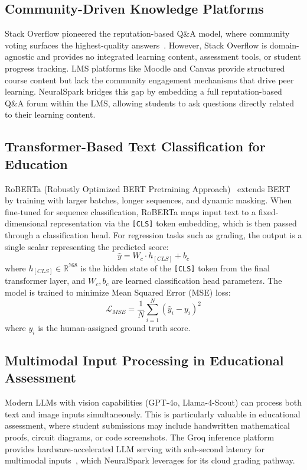 \documentclass[conference]{IEEEtran}
\begin{document}
\subsection{Community-Driven Knowledge Platforms}
Stack Overflow pioneered the reputation-based Q\&A model, where community voting surfaces the highest-quality answers~\cite{stackoverflow_study}. However, Stack Overflow is domain-agnostic and provides no integrated learning content, assessment tools, or student progress tracking. LMS platforms like Moodle and Canvas provide structured course content but lack the community engagement mechanisms that drive peer learning. NeuralSpark bridges this gap by embedding a full reputation-based Q\&A forum within the LMS, allowing students to ask questions directly related to their learning content.

\subsection{Transformer-Based Text Classification for Education}
RoBERTa (Robustly Optimized BERT Pretraining Approach)~\cite{roberta} extends BERT~\cite{bert} by training with larger batches, longer sequences, and dynamic masking. When fine-tuned for sequence classification, RoBERTa maps input text to a fixed-dimensional representation via the \texttt{[CLS]} token embedding, which is then passed through a classification head. For regression tasks such as grading, the output is a single scalar representing the predicted score:
\begin{equation}
\hat{y} = W_c \cdot h_{[CLS]} + b_c
\end{equation}
where $h_{[CLS]} \in \mathbb{R}^{768}$ is the hidden state of the \texttt{[CLS]} token from the final transformer layer, and $W_c, b_c$ are learned classification head parameters. The model is trained to minimize Mean Squared Error (MSE) loss:
\begin{equation}
\mathcal{L}_{MSE} = \frac{1}{N} \sum_{i=1}^{N} (\hat{y}_i - y_i)^2
\end{equation}
where $y_i$ is the human-assigned ground truth score.

\subsection{Multimodal Input Processing in Educational Assessment}
Modern LLMs with vision capabilities (GPT-4o, Llama-4-Scout) can process both text and image inputs simultaneously. This is particularly valuable in educational assessment, where student submissions may include handwritten mathematical proofs, circuit diagrams, or code screenshots. The Groq inference platform provides hardware-accelerated LLM serving with sub-second latency for multimodal inputs~\cite{groq_platform}, which NeuralSpark leverages for its cloud grading pathway.
\end{document}
